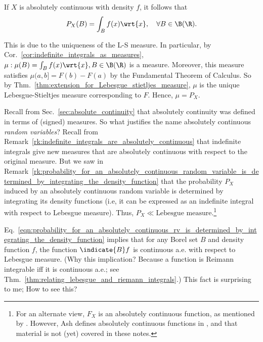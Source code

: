 \documentclass{article} %
\begin{document}
\begin{remark}
If $X$ is absolutely continuous with density $f$, it follows that
\begin{align}
P_X(B) = \int_B f(x) \wrt{x}, \quad \forall B \in \B(\R).
\label{eqn:probability_for_an_absolutely_continuous_rv_is_determined_by_integrating_the_density_function}	
\end{align}

This is due to the uniqueness of the L-S measure.  In particular, by Cor.~\ref{cor:indefinite_integrals_as_measures}, $\mu : \mu(B) = \int_B f(x) \wrt{x}, B \in \B(\R)$ is a measure.  Moreover, this measure satisfies $\mu(a,b] = F(b) - F(a)$ by the Fundamental Theorem of Calculus.  So by Thm.~\ref{thm:extension_for_Lebesgue_stietljes_measure},  $\mu$ is the unique Lebesgue-Stieltjes measure corresponding to $F$. Hence, $\mu=P_X$.
\label{rk:probability_for_an_absolutely_continuous_random_variable_is_determined_by_integrating_the_density_function}	
\end{remark}

\begin{remark}
Recall from Sec.~\ref{sec:absolute_continuity} that absolutely continuity was defined in terms of (signed) measures.  So what justifies the name absolutely continuous \textit{random variables}?  Recall from Remark~\ref{rk:indefinite_integrals_are_absolutely_continuous} that indefinite integrals give new measures that are absolutely continuous with respect to the original measure.  But we saw in Remark~\ref{rk:probability_for_an_absolutely_continuous_random_variable_is_determined_by_integrating_the_density_function} that the probability $P_X$ induced by an absolutely continuous random variable is determined by integrating its density functions (i.e, it can be expressed as an indefinite integral with respect to Lebesgue measure).   Thus, $P_X \ll \text{Lebesgue measure}$.\footnote{For an alternate view, $F_X$ is an absolutely continuous function, as mentioned by \cite[p.175]{ash2000probability}. However, Ash defines absolutely continuous functions in \cite[Sec.~2.3]{ash2000probability}, and that material is not (yet) covered in these notes.}
\end{remark}

\begin{question}
Eq.~\eqref{eqn:probability_for_an_absolutely_continuous_rv_is_determined_by_integrating_the_density_function} implies that for any Borel set $B$ and density function $f$, the function $\indicate{B} f$ is continuous a.e. with respect to Lebesgue measure. (Why this implication? Because a function is Reimann integrable iff it is continuous a.e.; see Thm.~\ref{thm:relating_lebesgue_and_riemann_integrals}.) This fact is surprising to me;  How to see this?
\end{question}
\end{document}
